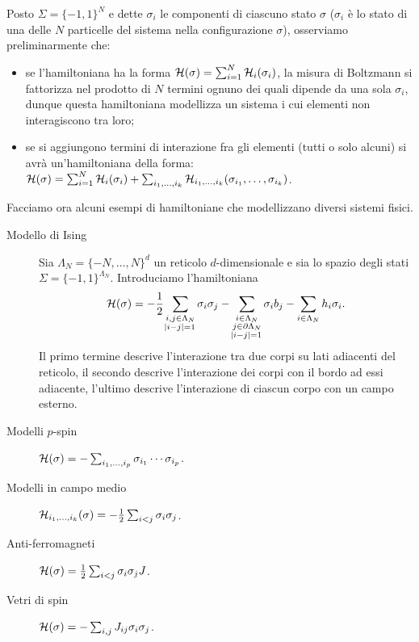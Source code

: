 Posto $ \Sigma = \{-1,1\}^N $ e dette $ \sigma_i $ le componenti di ciascuno stato $ \sigma $ ($ \sigma_i $ è lo stato di una delle $ N $ particelle del sistema nella configurazione $ \sigma $), osserviamo preliminarmente che:
\begin{itemize}
    \item se l'hamiltoniana ha la forma $ \mathcal{H}(\sigma) = \sum_{i=1}^{N} \mathcal{H}_i(\sigma_i) $, la misura di Boltzmann si fattorizza nel prodotto di $ N $ termini ognuno dei quali dipende da una sola $ \sigma_i $, dunque questa hamiltoniana modellizza un sistema i cui elementi non interagiscono tra loro;
    \item se si aggiungono termini di interazione fra gli elementi (tutti o solo alcuni) si avrà un'hamiltoniana della forma:
    $ \mathcal{H}(\sigma) = \sum_{i=1}^{N} \mathcal{H}_i(\sigma_i) + \sum_{i_1, \ldots, i_k} \mathcal{H}_{i_1, \ldots, i_k} (\sigma_{i_1}, \ldots, \sigma_{i_k}) $.
\end{itemize}
Facciamo ora alcuni esempi di hamiltoniane che modellizzano diversi sistemi fisici.
\begin{description}
    \item[Modello di Ising] Sia $ \Lambda_N = \{-N, \ldots, N\}^d $ un reticolo $ d $-dimensionale e sia lo spazio degli stati $ \Sigma = \{-1,1\}^{\Lambda_N} $. Introduciamo l'hamiltoniana
    \[ \mathcal{H}(\sigma) = -\frac{1}{2}\sum_{\substack{i,j\in\Lambda_N\\ \abs{i-j}=1}} \sigma_i\sigma_j - \sum_{\substack{i\in\Lambda_N\\ j\in\partial\Lambda_N\\ \abs{i-j}=1}} \sigma_i b_j - \sum_{i\in\Lambda_N} h_i\sigma_i. \]
    Il primo termine descrive l'interazione tra due corpi su lati adiacenti del reticolo, il secondo descrive l'interazione dei corpi con il bordo ad essi adiacente, l'ultimo descrive l'interazione di ciascun corpo con un campo esterno.
    \item[Modelli $ p $-spin] $ \mathcal{H}(\sigma) = -\sum_{i_1, \ldots, i_p} \sigma_{i_1} \cdots \sigma_{i_p} $.
    \item[Modelli in campo medio] $ \mathcal{H}_{i_1, \ldots, i_k}(\sigma) = -\frac{1}{2} \sum_{i<j}\sigma_i\sigma_j $.
    \item[Anti-ferromagneti] $ \mathcal{H}(\sigma) = \frac{1}{2} \sum_{i<j} \sigma_i\sigma_j J $.
    \item[Vetri di spin] $ \mathcal{H}(\sigma) = - \sum_{i,j} J_{ij} \sigma_i\sigma_j $.
\end{description}

